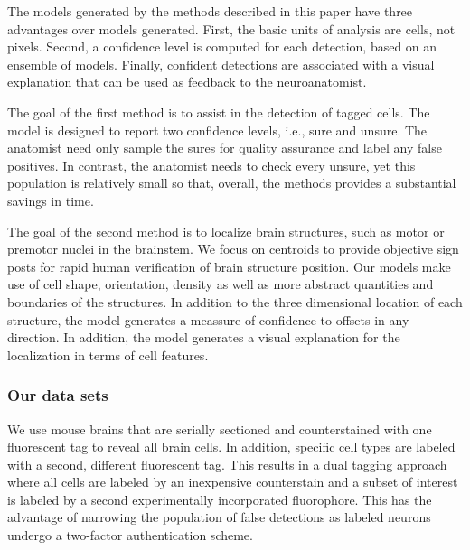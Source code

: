 \documentclass[11pt]{article}
\begin{document}
The models generated by the methods described in this paper have three advantages over models generated. First, the basic units of analysis are cells, not pixels. Second, a confidence level is computed for each detection, based on an ensemble of models. Finally, confident detections are associated with a visual explanation that can be used as feedback to the neuroanatomist.

The goal of the first method is to assist in the detection of tagged cells. The model is designed to report two confidence levels, i.e., sure and unsure. The anatomist need only sample the sures for quality assurance and label any false positives.  In contrast, the anatomist needs to check every unsure, yet this population is relatively small so that, overall, the methods provides a substantial savings in time.

The goal of the second method is to localize brain structures, such as motor or premotor nuclei in the brainstem. We focus on centroids to provide objective sign posts for rapid human verification of brain structure position. Our models make use of cell shape, orientation, density as well as more abstract quantities and boundaries of the structures. In addition to the three dimensional location of each structure, the model generates a meassure of confidence to offsets in any direction. In addition, the model generates a visual explanation for the localization in terms of cell features.



\subsubsection{Our data sets}

We use mouse brains that are serially sectioned and counterstained with one fluorescent tag to reveal all brain cells.  In addition, specific cell types are labeled with a second, different fluorescent tag. This results in a dual tagging approach where all cells are labeled by an inexpensive counterstain and a subset of interest is labeled by a second experimentally incorporated fluorophore. This has the advantage of narrowing the population of false detections as labeled neurons undergo a two-factor authentication scheme. 
\end{document}
